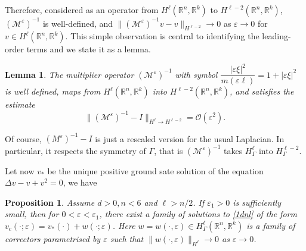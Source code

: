 \documentclass[letterpaper,11pt]{article}
\newcommand{\R}{\mathbb{R}}
\newcommand{\rmO}{\mathcal{O}}
\newcommand{\eps}{\varepsilon}
\newcommand{\M}{\mathcal{M}}
\numberwithin{equation}{section}
\theoremstyle{plain}
\newtheorem{proposition}[theorem]{Proposition}
\newtheorem{lemma}[theorem]{Lemma}
\theoremstyle{remark}
\begin{document}
Therefore, considered as an operator from $H^\ell (\R^n,\R^k)$ to $H^{\ell-2}(\R^n,\R^k)$, $(\M^\eps)^{-1}$ is well-defined, and $\|(\M^{\eps})^{-1}v - v\|_{H^{\ell-2}} \to 0$ as $\eps \to 0$ for $v \in H^\ell (\R^n,\R^k)$. This simple observation is central to identifying the leading-order terms and  we state it as a lemma.

\iffalse
recall we defined \[ 
\widehat{\mathcal{M}^\eps v}(\xi) = \frac{m(\eps\xi)}{|\eps\xi|^2}\widehat{v}(\xi)=\frac{1}{1+|\eps\xi|^2} \widehat{v}(\xi). 
\] 
Since $1/(1+|\eps \xi|^2)$ is a bounded function on $\R^n$, $\M^\eps$ maps $H^\ell(\R^n,\R^k)$ into itself. And we had
\fi


\begin{lemma}\label{estmult}The multiplier operator $(\M^\eps)^{-1}$ with symbol $\dfrac{|\eps\xi|^2}{m(\eps\ell)}=1+|\eps\xi|^2 $ is well defined, maps from $H^\ell  (\R^n,\R^k)$ into $H^{\ell-2} (\R^n,\R^k)$, and satisfies the estimate
\[
\|(\M^\eps)^{-1}-I\|_{H^\ell \to H^{\ell-2}} = \rmO(\eps^2).
\]
\end{lemma}


Of course, $(M^\eps)^{-1}-I$ is just a rescaled version for the usual Laplacian. In particular, it respects the symmetry of $\Gamma$, that is $(\M^\eps)^{-1}$ takes  $H^\ell_{\Gamma}$ into $H^{\ell-2}_{\Gamma}$.


Let now $v_*$ be the unique positive ground sate solution of the equation $\Delta v - v +v^2 = 0$, we have
\begin{proposition}\label{prop}Assume $d>0, n<6$ and $\ell>n/2$. If $\eps_1>0$ is sufficiently small, then for $0<\eps <\eps_1$, there exist a family of solutions to \eqref{1dnl} of the form $v_c(\cdot;\eps) = v_*(\cdot)+w(\cdot; \eps)$. Here $w=w(\cdot,\eps) \in H^{\ell}_{\Gamma}(\R^n,\R^k)$ is a family of correctors parametrised by $\eps $ such that $\|w(\cdot,\eps)\|_{H^\ell} \to 0$ as $\eps \to 0$.
\end{proposition}

\end{document}

